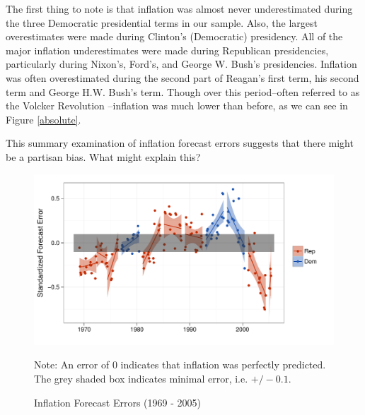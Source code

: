 \documentclass[a4paper]{article}\usepackage{graphicx, color}
\newenvironment{knitrout}{}{} %
\begin{document}
The first thing to note is that inflation was almost never underestimated during the three Democratic presidential terms in our sample. Also, the largest overestimates were made during Clinton's (Democratic) presidency. All of the major inflation underestimates were made during Republican presidencies, particularly during Nixon's, Ford's, and George W. Bush's presidencies. Inflation was often overestimated during the second part of Reagan's first term, his second term and George H.W. Bush's term. Though over this period--often referred to as the Volcker Revolution \citep[see][]{Bartels1985}--inflation was much lower than before, as we can see in Figure \ref{absolute}.

This summary examination of inflation forecast errors suggests that there might be a partisan bias. What might explain this?

\begin{figure}[t]
    \caption{Inflation Forecast Errors (1969 - 2005)}
    \label{errors_over_time}
    \begin{center}
    
\begin{knitrout}
\color{fgcolor}\includegraphics[width=0.8\linewidth]{figure/PartisanError} 
\end{knitrout}

    
    \end{center}
    \begin{singlespace}
        {\scriptsize{Note: An error of 0 indicates that inflation was perfectly predicted. \\
            The grey shaded box indicates minimal error, i.e. $+/- 0.1$.
        }}
    \end{singlespace}
\end{figure}


\end{document}
